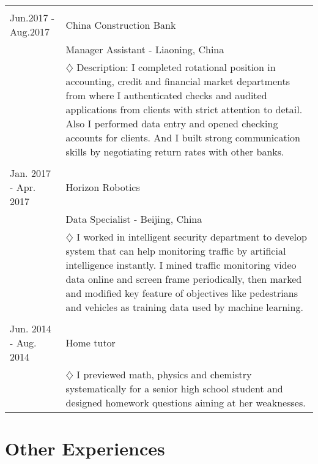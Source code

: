 \documentclass[a4paper,11pt]{article} %
\begin{document}
\begin{longtable}{p{4cm}|p{11cm}}

\multicolumn{2}{c}{}\\
Jun.2017 - Aug.2017 & China Construction Bank\\
& Manager Assistant - Liaoning, China\\
& \footnotesize{$\diamondsuit$  Description: I completed rotational position in accounting, credit and financial market departments from where I authenticated checks and audited applications from clients with strict attention to detail. Also I performed data entry and opened checking accounts for clients. And I built strong communication skills by negotiating return rates with other banks.}\\

\multicolumn{2}{c}{}\\
Jan. 2017 - Apr. 2017 &  Horizon Robotics\\
& Data Specialist - Beijing, China\\
& \footnotesize{$\diamondsuit$ I worked in 
intelligent security department to develop system that can help monitoring traffic by artificial intelligence instantly. I mined traffic monitoring video data online and screen frame periodically, then marked and modified key feature of objectives like pedestrians and vehicles as training data used by machine learning.}\\

\multicolumn{2}{c}{}\\
Jun. 2014 - Aug. 2014 &  Home tutor\\
& \footnotesize{$\diamondsuit$ I previewed math, physics and chemistry systematically for a senior high school student and designed homework questions aiming at her weaknesses.}\\

\end{longtable}

\section{Other Experiences}
\end{document}
